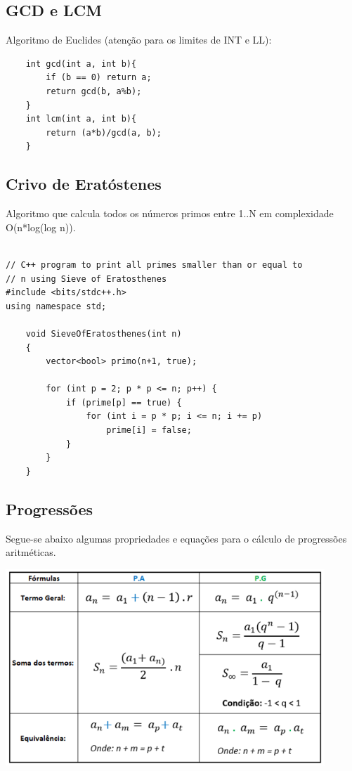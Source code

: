 \subsection{GCD e LCM}
\par Algoritmo de Euclides (atenção para os limites de INT e LL):
\begin{verbatim}
    int gcd(int a, int b){
        if (b == 0) return a;
        return gcd(b, a%b);
    }
    int lcm(int a, int b){
        return (a*b)/gcd(a, b);
    }
\end{verbatim}

\subsection{Crivo de Eratóstenes}
Algoritmo que calcula todos os números primos entre 1..N em complexidade \\
 O(n*log(log n)).
\begin{verbatim}
    
// C++ program to print all primes smaller than or equal to
// n using Sieve of Eratosthenes
#include <bits/stdc++.h>
using namespace std;
 
    void SieveOfEratosthenes(int n)
    {
        vector<bool> primo(n+1, true);
    
        for (int p = 2; p * p <= n; p++) {
            if (prime[p] == true) {
                for (int i = p * p; i <= n; i += p)
                    prime[i] = false;
            }
        }
    }
\end{verbatim}

\subsection{Progressões}
    Segue-se abaixo algumas propriedades e equações para o cálculo de 
    progressões aritméticas.
    
    \includegraphics[width=120mm]{7_teoria_dos_numeros/PA_PG.png}

